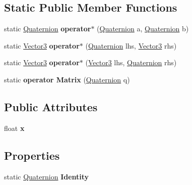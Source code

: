 \subsection*{Static Public Member Functions}
\begin{DoxyCompactItemize}
\item 
\mbox{\label{class_pillar3_d_1_1_quaternion_a55910a158e22f9b1eb91bfc63358ba9a}} 
static \hyperlink{class_pillar3_d_1_1_quaternion}{Quaternion} {\bfseries operator$\ast$} (\hyperlink{class_pillar3_d_1_1_quaternion}{Quaternion} a, \hyperlink{class_pillar3_d_1_1_quaternion}{Quaternion} b)
\item 
\mbox{\label{class_pillar3_d_1_1_quaternion_a4aad30009497a99cc92be7803bdb787a}} 
static \hyperlink{class_pillar3_d_1_1_vector3}{Vector3} {\bfseries operator$\ast$} (\hyperlink{class_pillar3_d_1_1_quaternion}{Quaternion} lhs, \hyperlink{class_pillar3_d_1_1_vector3}{Vector3} rhs)
\item 
\mbox{\label{class_pillar3_d_1_1_quaternion_af1536058adc5b68a327102d5f20f61a4}} 
static \hyperlink{class_pillar3_d_1_1_vector3}{Vector3} {\bfseries operator$\ast$} (\hyperlink{class_pillar3_d_1_1_vector3}{Vector3} lhs, \hyperlink{class_pillar3_d_1_1_quaternion}{Quaternion} rhs)
\item 
\mbox{\label{class_pillar3_d_1_1_quaternion_ac659977c8ac4a053df26033117f0cbcb}} 
static {\bfseries operator Matrix} (\hyperlink{class_pillar3_d_1_1_quaternion}{Quaternion} q)
\end{DoxyCompactItemize}
\subsection*{Public Attributes}
\begin{DoxyCompactItemize}
\item 
\mbox{\label{class_pillar3_d_1_1_quaternion_a7437a39c5debcbdd2f97812eadf664aa}} 
float {\bfseries x}
\end{DoxyCompactItemize}
\subsection*{Properties}
\begin{DoxyCompactItemize}
\item 
\mbox{\label{class_pillar3_d_1_1_quaternion_a9e0a2596ecdb60e40faf6580dd1ee0c2}} 
static \hyperlink{class_pillar3_d_1_1_quaternion}{Quaternion} {\bfseries Identity}
\end{DoxyCompactItemize}


